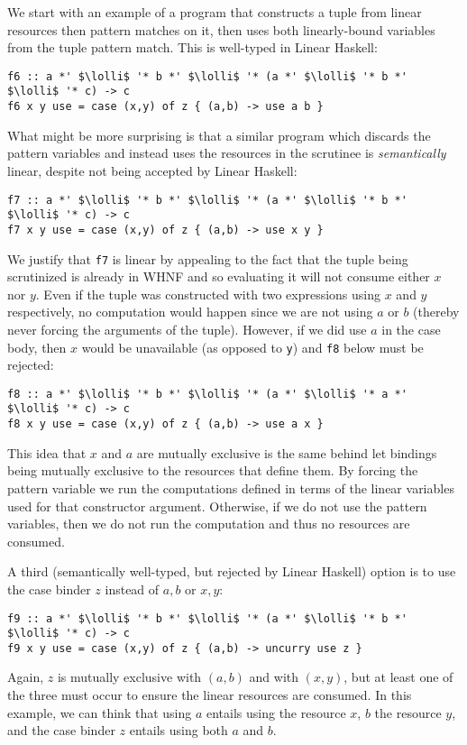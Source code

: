 \documentclass[acmsmall,review,anonymous,screen]{acmart}
\newcommand{\incode}[1]{\lstinline{#1}}
\newcommand{\lolli}{\multimap}
\begin{document}
We start with an
example of a program that constructs a tuple from linear resources then pattern
matches on it, then uses both linearly-bound variables from the tuple pattern
match. This is well-typed in Linear Haskell:
\begin{working}
\begin{lstlisting}
f6 :: a *' $\lolli$ '* b *' $\lolli$ '* (a *' $\lolli$ '* b *' $\lolli$ '* c) -> c
f6 x y use = case (x,y) of z { (a,b) -> use a b }
\end{lstlisting}
\end{working}
What might be more surprising is that a similar program which discards the
pattern variables and instead uses the resources in the scrutinee is 
\emph{semantically} linear, despite not being accepted by Linear Haskell:
\begin{notyet}
\begin{lstlisting}
f7 :: a *' $\lolli$ '* b *' $\lolli$ '* (a *' $\lolli$ '* b *' $\lolli$ '* c) -> c
f7 x y use = case (x,y) of z { (a,b) -> use x y }
\end{lstlisting}
\end{notyet}
We justify that \incode{f7} is linear by appealing to the fact that 
the tuple being scrutinized is already in WHNF and so evaluating it will
not consume either $x$ nor $y$. Even if the tuple was constructed with
two expressions using $x$ and $y$ respectively, no computation would happen
since we are not using $a$ or $b$ (thereby never forcing the arguments
of the tuple). However, if we did use $a$ in the case body, then $x$
would be unavailable (as opposed to \incode{y}) and \incode{f8} below must be rejected:
\begin{noway}
\begin{lstlisting}
f8 :: a *' $\lolli$ '* b *' $\lolli$ '* (a *' $\lolli$ '* a *' $\lolli$ '* c) -> c
f8 x y use = case (x,y) of z { (a,b) -> use a x }
\end{lstlisting}
\end{noway}
This idea that $x$ and $a$ are mutually exclusive is the same behind let
bindings being mutually exclusive to the resources that define them.
By forcing the pattern variable we run the computations
defined in terms of the linear variables used for that constructor
argument. Otherwise, if we do not use the pattern variables, then we
do not run the computation and thus no resources are consumed.

A third (semantically well-typed, but rejected by Linear Haskell) option is to use the case binder $z$ instead of $a,b$ or $x,y$:
\begin{notyet}
\begin{lstlisting}
f9 :: a *' $\lolli$ '* b *' $\lolli$ '* (a *' $\lolli$ '* b *' $\lolli$ '* c) -> c
f9 x y use = case (x,y) of z { (a,b) -> uncurry use z }
\end{lstlisting}
\end{notyet}
Again, $z$ is mutually exclusive with $(a,b)$ and with $(x,y)$, but at least one of
the three must occur to ensure the linear resources are consumed. In this
example, we can think that using $a$ entails using the resource $x$, $b$ the
resource $y$, and the case binder $z$ entails using both $a$ and $b$.
\end{document}
